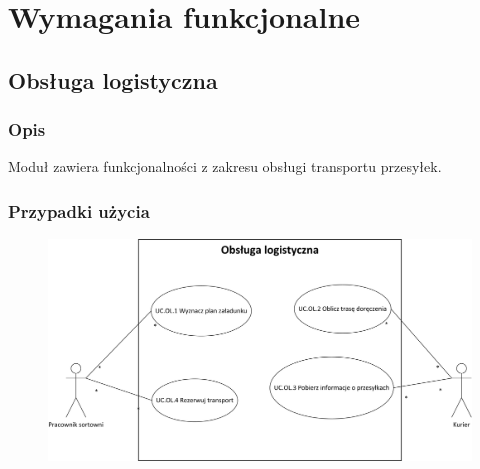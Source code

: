\section{Wymagania funkcjonalne}

\subsection{Obsługa logistyczna}
\subsubsection*{Opis}
Moduł zawiera funkcjonalności z zakresu obsługi transportu przesyłek.

\subsubsection*{Przypadki użycia}
\begin{figure}[H]
\centering
\includegraphics[width=\textwidth]{img/obs_log_uc}
\end{figure}


